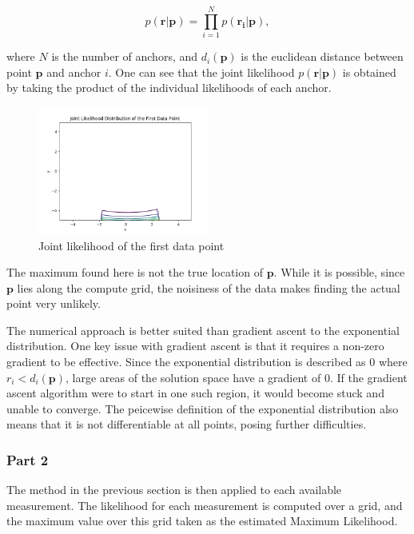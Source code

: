 \documentclass[a4paper]{article}
\begin{document}
\[
p(\bm{r}|\bm{p}) = \prod_{i=1}^N p(\bm{r_i}|\bm{p}) ,
\]

where $N$ is the number of anchors, and $d_i(\bm{p})$ is the euclidean distance between point $\bm{p}$ and anchor $i$.  One can see that the joint likelihood $p(\bm{r}|\bm{p})$ is obtained by taking the product of the individual likelihoods of each anchor.

\begin{figure}[h]
	\begin{center}
		\includegraphics[width=0.5\textwidth]{joint_likelihood_dist.png}
		\caption{Joint likelihood of the first data point}
	\end{center}
\end{figure}

The maximum found here is not the true location of $\bm{p}$.  While it is possible, since $\bm{p}$ lies along the compute grid, the noisiness of the data makes finding the actual point very unlikely.

The numerical approach is better suited than gradient ascent to the exponential distribution.  One key issue with gradient ascent is that it requires a non-zero gradient to be effective.  Since the exponential distribution is described as 0 where $r_i < d_i(\bm{p})$, large areas of the solution space have a gradient of 0.  If the gradient ascent algorithm were to start in one such region, it would become stuck and unable to converge.  The peicewise definition of the exponential distribution also means that it is not differentiable at all points, posing further difficulties.

\subsubsection*{Part 2}

The method in the previous section is then applied to each available measurement.  The likelihood for each measurement is computed over a grid, and the maximum value over this grid taken as the estimated Maximum Likelihood.
\end{document}

